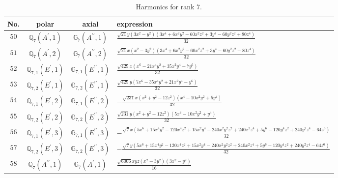 \documentclass[fleqn,8pt,landscape]{jsarticle}
\begin{document}
\begin{table}[ht!]
\begin{center}
\caption{Harmonics for rank 7.}
\renewcommand{\arraystretch}{1.3}
\begin{tabular}{cccl} \hline \hline
No. & polar & axial & expression \\ \hline
$ 50 $ & $ \mathbb{Q}_{7}(A^{\prime},1) $ & $ \mathbb{G}_{7}(A^{\prime\prime},1) $ & $ \frac{\sqrt{21} y \left(3 x^{2} - y^{2}\right) \left(3 x^{4} + 6 x^{2} y^{2} - 60 x^{2} z^{2} + 3 y^{4} - 60 y^{2} z^{2} + 80 z^{4}\right)}{32} $ \\
$ 51 $ & $ \mathbb{Q}_{7}(A^{\prime},2) $ & $ \mathbb{G}_{7}(A^{\prime\prime},2) $ & $ \frac{\sqrt{21} x \left(x^{2} - 3 y^{2}\right) \left(3 x^{4} + 6 x^{2} y^{2} - 60 x^{2} z^{2} + 3 y^{4} - 60 y^{2} z^{2} + 80 z^{4}\right)}{32} $ \\
$ 52 $ & $ \mathbb{Q}_{7,1}(E^{\prime},1) $ & $ \mathbb{G}_{7,1}(E^{\prime\prime},1) $ & $ \frac{\sqrt{429} x \left(x^{6} - 21 x^{4} y^{2} + 35 x^{2} y^{4} - 7 y^{6}\right)}{32} $ \\
$ 53 $ & $ \mathbb{Q}_{7,2}(E^{\prime},1) $ & $ \mathbb{G}_{7,2}(E^{\prime\prime},1) $ & $ \frac{\sqrt{429} y \left(7 x^{6} - 35 x^{4} y^{2} + 21 x^{2} y^{4} - y^{6}\right)}{32} $ \\
$ 54 $ & $ \mathbb{Q}_{7,1}(E^{\prime},2) $ & $ \mathbb{G}_{7,1}(E^{\prime\prime},2) $ & $ - \frac{\sqrt{231} x \left(x^{2} + y^{2} - 12 z^{2}\right) \left(x^{4} - 10 x^{2} y^{2} + 5 y^{4}\right)}{32} $ \\
$ 55 $ & $ \mathbb{Q}_{7,2}(E^{\prime},2) $ & $ \mathbb{G}_{7,2}(E^{\prime\prime},2) $ & $ \frac{\sqrt{231} y \left(x^{2} + y^{2} - 12 z^{2}\right) \left(5 x^{4} - 10 x^{2} y^{2} + y^{4}\right)}{32} $ \\
$ 56 $ & $ \mathbb{Q}_{7,1}(E^{\prime},3) $ & $ \mathbb{G}_{7,1}(E^{\prime\prime},3) $ & $ - \frac{\sqrt{7} x \left(5 x^{6} + 15 x^{4} y^{2} - 120 x^{4} z^{2} + 15 x^{2} y^{4} - 240 x^{2} y^{2} z^{2} + 240 x^{2} z^{4} + 5 y^{6} - 120 y^{4} z^{2} + 240 y^{2} z^{4} - 64 z^{6}\right)}{32} $ \\
$ 57 $ & $ \mathbb{Q}_{7,2}(E^{\prime},3) $ & $ \mathbb{G}_{7,2}(E^{\prime\prime},3) $ & $ - \frac{\sqrt{7} y \left(5 x^{6} + 15 x^{4} y^{2} - 120 x^{4} z^{2} + 15 x^{2} y^{4} - 240 x^{2} y^{2} z^{2} + 240 x^{2} z^{4} + 5 y^{6} - 120 y^{4} z^{2} + 240 y^{2} z^{4} - 64 z^{6}\right)}{32} $ \\
$ 58 $ & $ \mathbb{Q}_{7}(A^{\prime\prime},1) $ & $ \mathbb{G}_{7}(A^{\prime},1) $ & $ \frac{\sqrt{6006} x y z \left(x^{2} - 3 y^{2}\right) \left(3 x^{2} - y^{2}\right)}{16} $ \\

\end{tabular}
\end{center}
\end{table}
\end{document}
